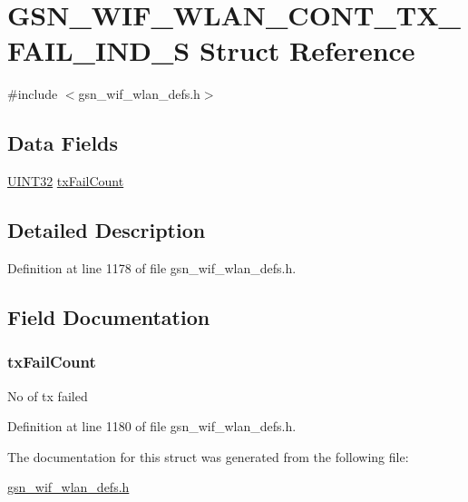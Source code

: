 \hypertarget{a00377}{
\section{GSN\_\-WIF\_\-WLAN\_\-CONT\_\-TX\_\-FAIL\_\-IND\_\-S Struct Reference}
\label{a00377}
}


{\ttfamily \#include $<$gsn\_\-wif\_\-wlan\_\-defs.h$>$}

\subsection*{Data Fields}
\begin{DoxyCompactItemize}
\item 
\hyperlink{a00660_gae1e6edbbc26d6fbc71a90190d0266018}{UINT32} \hyperlink{a00377_a0f4c10cf4ba95ffb8d3d1b77dcf36c1c}{txFailCount}
\end{DoxyCompactItemize}


\subsection{Detailed Description}


Definition at line 1178 of file gsn\_\-wif\_\-wlan\_\-defs.h.



\subsection{Field Documentation}
\hypertarget{a00377_a0f4c10cf4ba95ffb8d3d1b77dcf36c1c}{
\subsubsection[{txFailCount}]{ {\bf txFailCount}}}
\label{a00377_a0f4c10cf4ba95ffb8d3d1b77dcf36c1c}
No of tx failed 

Definition at line 1180 of file gsn\_\-wif\_\-wlan\_\-defs.h.



The documentation for this struct was generated from the following file:\begin{DoxyCompactItemize}
\item 
\hyperlink{a00613}{gsn\_\-wif\_\-wlan\_\-defs.h}\end{DoxyCompactItemize}
